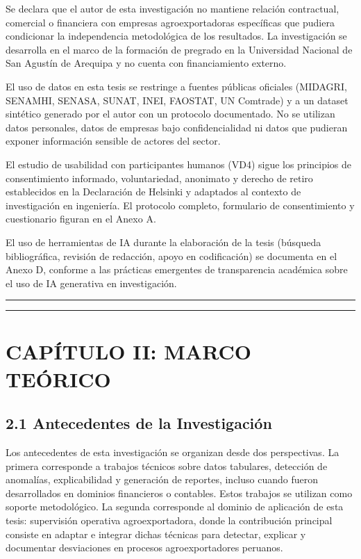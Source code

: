 Se declara que el autor de esta investigación no mantiene relación
contractual, comercial o financiera con empresas agroexportadoras
específicas que pudiera condicionar la independencia metodológica de los
resultados. La investigación se desarrolla en el marco de la formación
de pregrado en la Universidad Nacional de San Agustín de Arequipa y no
cuenta con financiamiento externo.

El uso de datos en esta tesis se restringe a fuentes públicas oficiales
(MIDAGRI, SENAMHI, SENASA, SUNAT, INEI, FAOSTAT, UN Comtrade) y a un
dataset sintético generado por el autor con un protocolo documentado. No
se utilizan datos personales, datos de empresas bajo confidencialidad ni
datos que pudieran exponer información sensible de actores del sector.

El estudio de usabilidad con participantes humanos (VD4) sigue los
principios de consentimiento informado, voluntariedad, anonimato y
derecho de retiro establecidos en la Declaración de Helsinki y adaptados
al contexto de investigación en ingeniería. El protocolo completo,
formulario de consentimiento y cuestionario figuran en el Anexo A.

El uso de herramientas de IA durante la elaboración de la tesis
(búsqueda bibliográfica, revisión de redacción, apoyo en codificación)
se documenta en el Anexo D, conforme a las prácticas emergentes de
transparencia académica sobre el uso de IA generativa en investigación.

\begin{center}\rule{0.5\linewidth}{0.5pt}\end{center}

\begin{center}\rule{0.5\linewidth}{0.5pt}\end{center}

\section{CAPÍTULO II: MARCO
TEÓRICO}\label{capuxedtulo-ii-marco-teuxf3rico}

\subsection{2.1 Antecedentes de la
Investigación}\label{antecedentes-de-la-investigaciuxf3n}

Los antecedentes de esta investigación se organizan desde dos
perspectivas. La primera corresponde a trabajos técnicos sobre datos
tabulares, detección de anomalías, explicabilidad y generación de
reportes, incluso cuando fueron desarrollados en dominios financieros o
contables. Estos trabajos se utilizan como soporte metodológico. La
segunda corresponde al dominio de aplicación de esta tesis: supervisión
operativa agroexportadora, donde la contribución principal consiste en
adaptar e integrar dichas técnicas para detectar, explicar y documentar
desviaciones en procesos agroexportadores peruanos.

